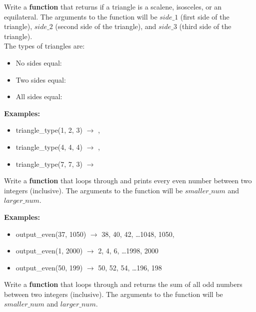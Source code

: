 	\item 
		Write a \textbf{function} that returns if a triangle is a scalene, isosceles, or an equilateral. The arguments to the function will be 
		$side\_1$ (first side of the triangle), $side\_2$ (second side of the triangle), and $side\_3$ (third side of the triangle).\\
		The types of triangles are: 
		\begin{itemize}
			\item No sides equal: 
			\item Two sides equal: 
			\item All sides equal: 	
		\end{itemize}
		\textbf{Examples:}		
		\begin{itemize}
			\item  triangle\_type(1, 2, 3) $\rightarrow$ , 
			\item  triangle\_type(4, 4, 4) $\rightarrow$ , 
			\item  triangle\_type(7, 7, 3) $\rightarrow$  
		\end{itemize}


	\item 
		Write a \textbf{function} that loops through and prints every even number between two
		integers (inclusive). The arguments to the function will be $smaller\_num$ and 
		$larger\_num$.

		\textbf{Examples:}		
		\begin{itemize}
			\item  output\_even(37, 1050) $\rightarrow$ 38, 40, 42, \dots 1048, 1050, 
			\item  output\_even(1, 2000) $\rightarrow$ 2, 4, 6, \dots 1998, 2000 
			\item  output\_even(50, 199) $\rightarrow$ 50, 52, 54, \dots 196, 198
		\end{itemize}


	\item 
		Write a \textbf{function} that loops through and returns the sum of all odd numbers 
		between two integers (inclusive). The arguments to the function will be $smaller\_num$ 
		and $larger\_num$.

